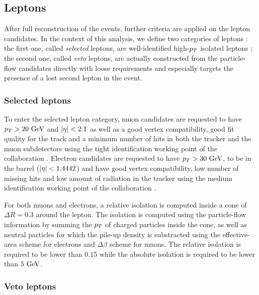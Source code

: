         \subsection{Leptons}

    After full reconstruction of the events, further criteria are applied on the lepton
    candidates. In the context of this analysis, we define two categories of leptons :
    the first one, called \emph{selected} leptons, are well-identified high-$p_T$ 
    isolated leptons ; the second one, called \emph{veto} leptons, are actually 
    constructed from the particle-flow candidates directly with loose requirements and 
    especially targets the presence of a lost second lepton in the event.

            \subsubsection{Selected leptons}

        To enter the selected lepton category, muon candidates are requested to have 
    $p_T > 20~\text{GeV}$ and $\left| \eta \right| < 2.1$ as well as a good vertex compatibility, good fit 
    quality for the track and a minimum number of hits in both the tracker and the muon 
    subdetectors using the tight identification working point of the collaboration 
    .
        Electron candidates are requested to have $p_T > 30~\text{GeV}$, to be in the barrel 
    ($\left| \eta \right| < 1.4442$) and have good vertex compatibility, low number of missing hits 
    and low amount of radiation in the tracker using the medium identification working 
    point of the collaboration 
    .

    For both muons and electrons, a relative isolation is computed inside a cone of 
    $\Delta R = 0.3$ around the lepton. The isolation is computed using the particle-flow 
    information by summing the $p_T$ of charged particles inside the cone, as well as 
    neutral particles for which the pile-up density is substracted using the effective-area 
    scheme for electrons and $\Delta \beta$ scheme for muons. The relative isolation is 
    required to be lower than 0.15 while the absolute isolation is required to be lower 
    than $5~\text{GeV}$.

        \subsubsection{Veto leptons \label{sec:vetoLeptons}}

